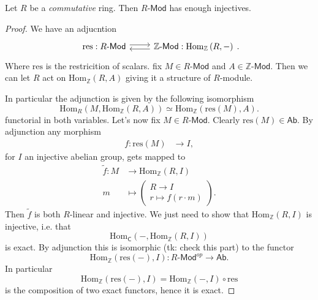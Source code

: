 \documentclass[../Main]{subfiles}
\begin{document}
\begin{prop}
	Let $R$ be a {\em commutative} ring.
	Then $R\text{-}\mathsf{Mod}$ has enough injectives.
\end{prop} 
\begin{proof}
	We have an adjucntion
	\begin{equation}
	\begin{tikzcd}
		\mathrm{res}: R\text{-}\mathsf{Mod} \arrow[r, "", rightarrow, shift left] &
		\mathbb{Z}\text{-}\mathsf{Mod} : \mathrm{Hom}_{\mathbb{Z}} \left( R, - \right)
		\arrow[l, "", rightarrow, shift left] 
	\end{tikzcd}
	.\end{equation} 
	Where $\mathrm{res}$ is the restricition of scalars.
	fix $M \in R\text{-}\mathsf{Mod}$ and $A \in \mathbb{Z}\text{-}\mathsf{Mod}$.
	Then we can let $R$ act on $\mathrm{Hom}_{\mathbb{Z}} \left( R, A \right)$
	giving it a structure of $R$-module.

	In particular the adjunction is given by the following isomorphism
	\begin{equation}
	\mathrm{Hom}_{R} \left( M, \mathrm{Hom}_{\mathbb{Z}} \left( R, A \right) \right) \simeq
	\mathrm{Hom}_{\mathbb{Z}} \left( \mathrm{res}(M), A \right)
	.\end{equation} 	
	functorial in both variables.
	Let's now fix $M \in R\text{-}\mathsf{Mod}$.
	Clearly $\mathrm{res}(M) \in \mathsf{Ab}$.
	By adjunction any morphism
	\begin{align}
		f\colon \mathrm{res}(M) &\longrightarrow I
	,\end{align} 
	for $I$ an injective abelian group, gets mapped to
	\begin{align}
		\tilde{f}\colon M &\longrightarrow \mathrm{Hom}_{\mathbb{Z}} \left( R, I \right) \\
		m &\longmapsto 
		\begin{pmatrix}
			R \to I\\
			r \mapsto f(r\cdot m)
		\end{pmatrix} 
		\nonumber
	.\end{align} 
	Then $\tilde{f}$ is both $R$-linear and injective.
	We just need to show that $\mathrm{Hom}_{\mathbb{Z}} \left( R, I \right)$
	is injective, i.e. that
	\begin{equation}
	\mathrm{Hom}_{\mathsf{C}} \left( -, \mathrm{Hom}_{\mathbb{Z}} \left( R, I \right) \right)
	\end{equation} 
	is exact. By adjunction this is isomorphic (tk: check this part)
	to the functor
	\begin{equation}
		\mathrm{Hom}_{\mathbb{Z}} \left( \mathrm{res}(-), I \right):
		R\text{-}\mathsf{Mod}^{op} \to \mathsf{Ab}		
	.\end{equation} 
	In particular
	\begin{equation}
		\mathrm{Hom}_{\mathbb{Z}} \left( \mathrm{res}(-), I \right) =
		\mathrm{Hom}_{\mathbb{Z}} \left( -, I \right) \circ \mathrm{res}
	\end{equation} 
	is the composition of two exact functors, hence it is exact.
\end{proof}
\end{document}
